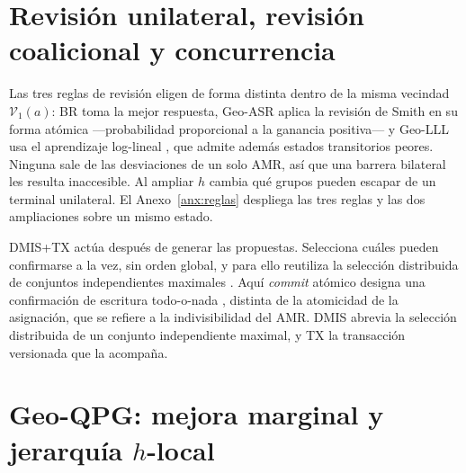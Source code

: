 \documentclass[12pt,a4paper]{article}
\theoremstyle{remark}
\theoremstyle{plain}
\begin{document}
\section{Revisión unilateral, revisión coalicional y concurrencia}

Las tres reglas de revisión eligen de forma distinta dentro de la misma vecindad
$\mathcal V_1(a)$: BR toma la mejor respuesta, Geo-ASR aplica la revisión de
Smith en su forma atómica ---probabilidad proporcional a la ganancia positiva--- y
Geo-LLL usa el aprendizaje log-lineal \citep{mardenShamma2012LogLinear}, que
admite además estados transitorios peores. Ninguna sale de las desviaciones de un
solo AMR, así que una barrera bilateral les resulta inaccesible. Al ampliar $h$
cambia qué grupos pueden escapar de un terminal unilateral. El
Anexo~\ref{anx:reglas} despliega las tres reglas y las dos ampliaciones sobre un
mismo estado.

DMIS+TX actúa después de generar las propuestas. Selecciona cuáles pueden
confirmarse a la vez, sin orden global, y para ello reutiliza la selección
distribuida de conjuntos independientes maximales
\citep{luby1986MIS}. Aquí \emph{commit} atómico designa una confirmación de escritura todo-o-nada
\citep{grayLamport2006Commit}, distinta de la atomicidad de la asignación, que se
refiere a la indivisibilidad del AMR. DMIS abrevia la selección distribuida de un
conjunto independiente maximal, y TX la transacción versionada que la acompaña.

\section{Geo-QPG: mejora marginal y jerarquía $h$-local}
\end{document}
